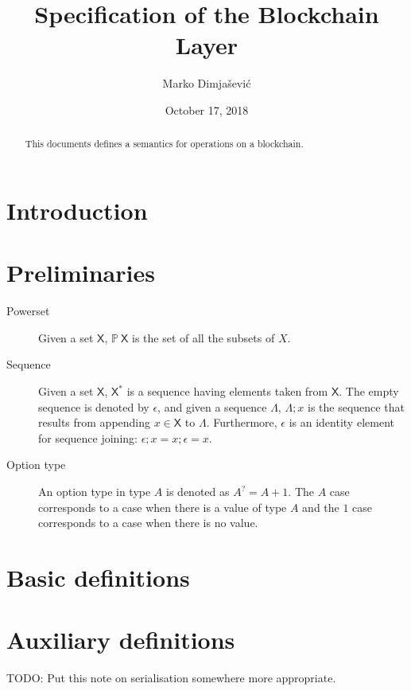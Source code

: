 \documentclass[11pt,a4paper]{article}
\newcommand{\powerset}[1]{\mathbb{P}~#1}
\newcommand{\type}[1]{\mathsf{#1}}
\newcommand{\seqof}[1]{#1^{*}}
\begin{document}
\title{Specification of the Blockchain Layer}

\author{Marko Dimjašević}

\date{October 17, 2018}

\maketitle

\begin{abstract}
This documents defines a semantics for operations on a blockchain.
\end{abstract}

\tableofcontents
\listoffigures

\section{Introduction}
\label{sec:introduction}

\section{Preliminaries}
\label{sec:preliminaries}

\begin{description}
\item[Powerset] Given a set $\type{X}$, $\powerset{\type{X}}$ is the set of all
  the subsets of $X$.
\item[Sequence] Given a set $\type{X}$, $\seqof{\type{X}}$ is a sequence
  having elements taken from $\type{X}$.
  The empty sequence is denoted by $\epsilon$, and given a sequence $\Lambda$,
  $\Lambda; x$ is the sequence that results from appending
  $x \in \type{X}$ to $\Lambda$.
  Furthermore, $\epsilon$ is an identity element for sequence joining:
  $\epsilon; x = x; \epsilon = x$.
\item[Option type] An option type in type $A$ is denoted as $A^? = A + 1$. The
  $A$ case corresponds to a case when there is a value of type $A$ and the $1$
  case corresponds to a case when there is no value.
\end{description}

\section{Basic definitions}
\label{sec:basic-definitions}

\section{Auxiliary definitions}
\label{sec:auxil-defin}
TODO: Put this note on serialisation somewhere more appropriate.
\end{document}

